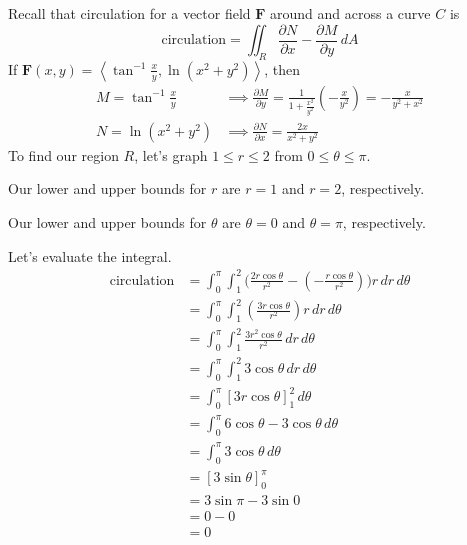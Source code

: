 \documentclass{article}
\newcommand{\lrp}[1]{\left( #1 \right)}
\newcommand{\lra}[1]{\left\langle #1 \right\rangle}
\newcommand{\lrb}[1]{\left[ #1 \right]}
\newcommand{\F}[0]{\mathbf{F}}
\begin{document}
Recall that circulation for a vector field $\F$ around and across a curve $C$ is
\begin{equation*}
    \text{circulation}= \iint_R \frac{\partial N}{\partial x} - \frac{\partial M}{\partial y}\,dA
\end{equation*}
If $\displaystyle\F(x,y)=\lra{\tan^{-1}\frac{x}{y},\ln(x^2+y^2)}$, then
\begin{align*}
    M=\tan^{-1}\frac{x}{y}&\implies \frac{\partial M}{\partial y}=\frac{1}{1+\frac{x^2}{y^2}}\lrp{-\frac{x}{y^2}}=-\frac{x}{y^2+x^2}\\
    N=\ln(x^2+y^2)&\implies \frac{\partial N}{\partial x}=\frac{2x}{x^2+y^2}
\end{align*}
To find our region $R$, let's graph $1\leq r\leq 2$ from $0\leq \theta\leq \pi$.
\begin{center}
\end{center}
Our lower and upper bounds for $r$ are $r=1$ and $r=2$, respectively.

Our lower and upper bounds for $\theta$ are $\theta=0$ and $\theta=\pi$, respectively.

Let's evaluate the integral.
\begin{align*}
    \text{circulation}&=\int_0^{\pi}\int_1^2 \Bigg(\frac{2r\cos \theta}{r^2}-\lrp{-\frac{r\cos \theta}{r^2}}\Bigg)r\,dr\,d\theta\\
    &=\int_0^{\pi}\int_1^2 \lrp{\frac{3r\cos \theta}{r^2}}r\,dr\,d\theta\\
    &=\int_0^{\pi}\int_1^2 \frac{3r^2\cos \theta}{r^2}\,dr\,d\theta\\
    &=\int_0^{\pi}\int_1^2  3\cos \theta\,dr\,d\theta\\
    &=\int_0^{\pi}\lrb{3r\cos \theta }_1^2 \,d\theta\\
    &=\int_0^{\pi}6\cos \theta - 3\cos \theta\,d\theta\\
    &=\int_0^{\pi}3\cos\theta\,d\theta\\
    &=\lrb{3\sin \theta}_0^{\pi}\\
    &=3\sin \pi - 3\sin 0\\
    &= 0 - 0\\
    &=\boxed{0}
\end{align*}
\end{document}
